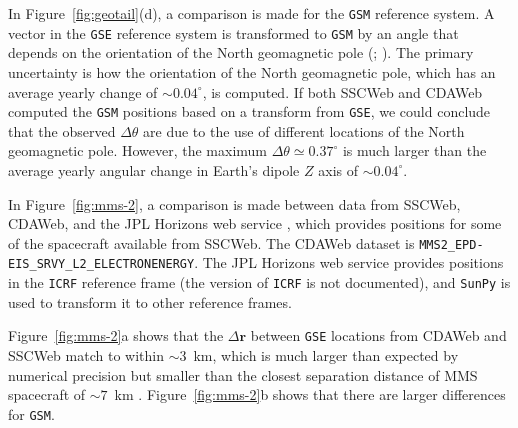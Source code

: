 \documentclass[draft]{agujournal2019}
\begin{document}
In Figure~\ref{fig:geotail}(d), a comparison is made for the \texttt{GSM} reference system. A vector in the \texttt{GSE} reference system is transformed to \texttt{GSM} by an angle that depends on the orientation of the North geomagnetic pole (; ). The primary uncertainty is how the orientation of the North geomagnetic pole, which has an average yearly change of ${\sim}0.04^\circ$, is computed. If both SSCWeb and CDAWeb computed the \texttt{GSM} positions based on a transform from \texttt{GSE}, we could conclude that the observed $\Delta \theta$ are due to the use of different locations of the North geomagnetic pole. However, the maximum $\Delta \theta \simeq 0.37^\circ$ is much larger than the average yearly angular change in Earth's dipole $Z$ axis of ${\sim}0.04^\circ$.




In Figure~\ref{fig:mms-2}, a comparison is made between data from SSCWeb, CDAWeb, and the JPL Horizons web service \cite{JPLHorizons}, which provides positions for some of the spacecraft available from SSCWeb. The CDAWeb dataset is  \texttt{MMS2\_EPD-EIS\_SRVY\_L2\_ELECTRONENERGY}. The JPL Horizons web service provides positions in the \texttt{ICRF} reference frame (the version of \texttt{ICRF} is not documented), and \texttt{SunPy} is used to transform it to other reference frames.

Figure~\ref{fig:mms-2}a shows that the $\Delta \mathbf{r}$ between \texttt{GSE} locations from CDAWeb and SSCWeb match to within ${\sim}3$~km, which is much larger than expected by numerical precision but smaller than the closest separation distance of MMS spacecraft of ${\sim}7$~km \cite{NASA2016}. Figure~\ref{fig:mms-2}b shows that there are larger differences for \texttt{GSM}.
\end{document}
